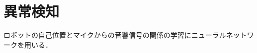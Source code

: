 \documentclass[../main]{subfiles}
\begin{document}
\section{異常検知}
\label{sec:pmethod_anomaly_detection}
ロボットの自己位置とマイクからの音響信号の関係の学習にニューラルネットワークを用いる．
\end{document}
